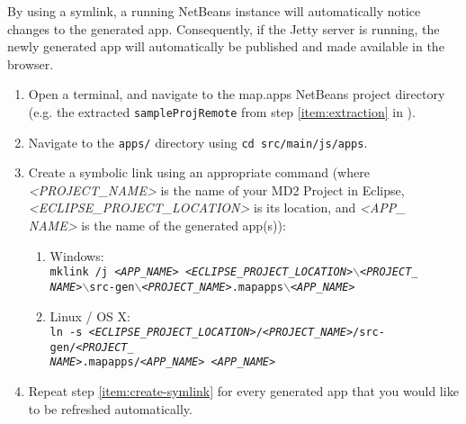 
\label{subsec:link-apps}

By using a symlink, a running NetBeans instance will automatically notice changes to the generated app. Consequently, if the Jetty server is running, the newly generated app will automatically be published and made available in the browser.

\begin{enumerate}
\item Open a terminal, and navigate to the map.apps NetBeans project directory (e.g. the extracted \texttt{sampleProjRemote} from step \ref{item:extraction} in ).
\item Navigate to the \texttt{apps/} directory using \texttt{cd src/main/js/apps}.
\item Create a symbolic link using an appropriate command (where \textit{<PROJECT\_NAME>} is the name of your MD2 Project in Eclipse, \textit{<ECLIPSE\_PROJECT\_LOCATION>} is its location, and \textit{<APP\_\\NAME>} is the name of the generated app(s)): \label{item:create-symlink}
	\begin{enumerate}
	\item Windows:\\
	\texttt{mklink /j \textit{<APP\_NAME>} \textit{<ECLIPSE\_PROJECT\_LOCATION>}$\backslash$\textit{<PROJECT\_\\
	NAME>}$\backslash$src-gen$\backslash$\textit{<PROJECT\_NAME>}.mapapps$\backslash$\textit{<APP\_NAME>}}
	
	\item Linux / OS X: \\
	\texttt{ln -s \textit{<ECLIPSE\_PROJECT\_LOCATION>}/\textit{<PROJECT\_NAME>}/src-gen/\textit{<PROJECT\_\\
	NAME>}.mapapps/\textit{<APP\_NAME>} \textit{<APP\_NAME>}}
	\end{enumerate}
	
\item Repeat step \ref{item:create-symlink} for every generated app that you would like to be refreshed automatically.
\end{enumerate}
